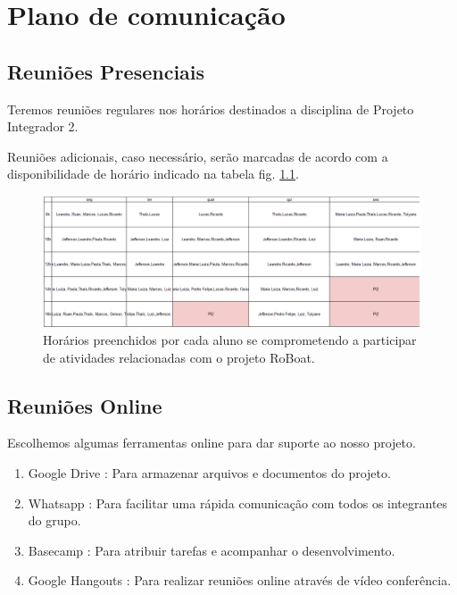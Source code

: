\chapter[Plano de comunicação]{Plano de comunicação}


\section{Reuniões Presenciais}

Teremos reuniões regulares nos horários destinados a disciplina de Projeto Integrador 2.

Reuniões adicionais, caso necessário, serão marcadas de acordo com a disponibilidade de horário indicado na tabela fig. \ref{horarios}.

 \begin{figure} [!htp]
	\centering
	\includegraphics[scale=0.5]{figuras/horarios}
	\caption{Horários preenchidos por cada aluno se comprometendo a participar de atividades relacionadas com o projeto RoBoat.}
	\label{horarios}
\end{figure}

\section{Reuniões Online}

Escolhemos algumas ferramentas online para dar suporte ao nosso projeto.

\begin{enumerate}
	
	\item Google Drive : Para armazenar arquivos e documentos do projeto.
	\item Whatsapp : Para facilitar uma rápida comunicação com todos os integrantes do grupo.
	\item Basecamp : Para atribuir tarefas e acompanhar o desenvolvimento.
	\item Google Hangouts : Para realizar reuniões online através de vídeo conferência. 
	
\end{enumerate}